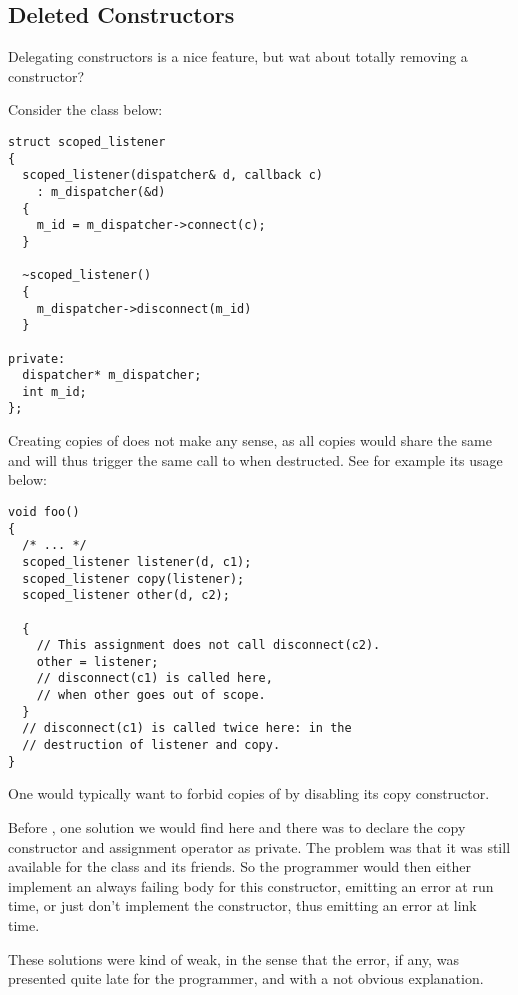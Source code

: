 \subsection{Deleted Constructors}

Delegating constructors is a nice feature, but wat about totally
removing a constructor?

Consider the class below:

\begin{lstlisting}
struct scoped_listener
{
  scoped_listener(dispatcher& d, callback c)
    : m_dispatcher(&d)
  {
    m_id = m_dispatcher->connect(c);
  }

  ~scoped_listener()
  {
    m_dispatcher->disconnect(m_id)
  }

private:
  dispatcher* m_dispatcher;
  int m_id;
};
\end{lstlisting}

Creating copies of  does not make any sense, as
all copies would share the same  and will thus trigger the
same call to  when destructed. See for example
its usage below:

\begin{lstlisting}
void foo()
{
  /* ... */
  scoped_listener listener(d, c1);
  scoped_listener copy(listener);
  scoped_listener other(d, c2);

  {
    // This assignment does not call disconnect(c2).
    other = listener;
    // disconnect(c1) is called here,
    // when other goes out of scope.
  }
  // disconnect(c1) is called twice here: in the
  // destruction of listener and copy.
}
\end{lstlisting}

One would typically want to forbid copies of  by
disabling its copy constructor.

Before , one solution we would find here and there was to
declare the copy constructor and assignment operator as private. The
problem was that it was still available for the class and its
friends. So the programmer would then either implement an always
failing body for this constructor, emitting an error at run time, or
just don't implement the constructor, thus emitting an error at link
time.

These solutions were kind of weak, in the sense that the error, if
any, was presented quite late for the programmer, and with a not
obvious explanation.

